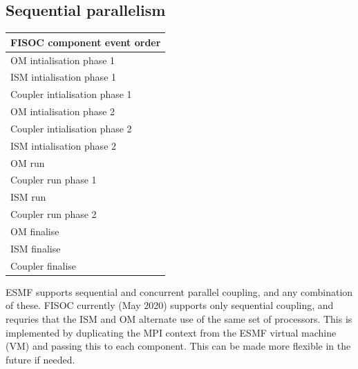 \documentclass[11pt]{article}
\begin{document}





\subsection{Sequential parallelism}

\begin{table}
  \begin{tabular}{|l}
    \textbf{FISOC component event order}  \\
    \hline
    OM intialisation phase 1 \\
    ISM intialisation phase 1 \\
    Coupler intialisation phase 1 \\
    OM intialisation phase 2 \\
    Coupler intialisation phase 2 \\
    ISM intialisation phase 2 \\
    OM run \\
    Coupler run phase 1 \\
    ISM run \\
    Coupler run phase 2 \\
    OM finalise \\
    ISM finalise \\
    Coupler finalise \\
  \end{tabular}
  \label{tab:order}
\end{table}

ESMF supports sequential and concurrent parallel coupling, and any combination of these. 
FISOC currently (May 2020) supports only sequential coupling, and requries that
the ISM and OM alternate use of the same set of processors.
This is implemented by duplicating the MPI context from the ESMF virtual machine (VM)
and passing this to each component. 
This can be made more flexible in the future if needed. 
\end{document}
